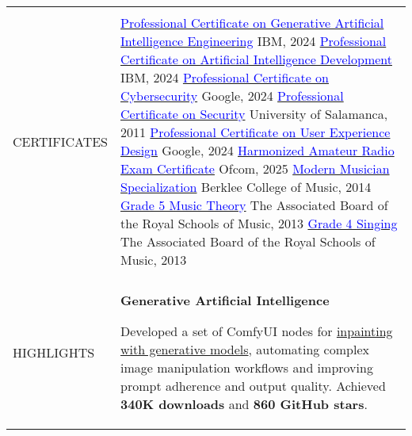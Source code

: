 \documentclass[letterpaper,10pt,oneside]{article}
\newcommand{\DatestampY}[1]{#1}
\newcommand{\itemspacingtwo}{\vspace{0.04cm}}
\newcommand{\sref}[2]{%
    \href{https://0/local/attachments/#1}{\textcolor{blue}{#2}}%
}
\newenvironment{body}
{\par\par
\begin{longtable}{p{0.145\textwidth}p{0.81\textwidth}}}
{\par\end{longtable}\par}
\renewcommand{\section}[3]{\\[-0.35cm]\pdfbookmark[2]{#2}{#3}\\%
\raggedleft  %
{\fontsize{9.5pt}{9.5pt}\selectfont\bfseries\raggedright%
\MakeUppercase{#1}}&}
\begin{document}
\begin{body}
\section{Certificates}{Certificates}{PDF:Certificates}
\sref{Certificate-Coursera-IBM-GenerativeAIEngineering.pdf}{Professional Certificate on Generative Artificial Intelligence Engineering} \textemdash{ }IBM, \DatestampY{2024} \newline
\sref{Certificate-Coursera-IBM-AIDeveloper.pdf}{Professional Certificate on Artificial Intelligence Development} \textemdash{ }IBM, \DatestampY{2024} \newline
\sref{Certificate-Coursera-Google-Cybersecurity.pdf}{Professional Certificate on Cybersecurity} \textemdash{ }Google, \DatestampY{2024} \newline
\sref{Certificate-Certyred.pdf}{Professional Certificate on Security} \textemdash{ }University of Salamanca, \DatestampY{2011} \newline
\sref{Certificate-Coursera-Google-UX-Design.pdf}{Professional Certificate on User Experience Design} \textemdash{ }Google, \DatestampY{2024} \newline
\sref{Certificate-HAREC.pdf}{Harmonized Amateur Radio Exam Certificate} \textemdash{ }Ofcom, \DatestampY{2025} \newline
\sref{Diploma-BerkleeCollege-ModernMusician.pdf}{Modern Musician Specialization} \textemdash{ }Berklee College of Music, \DatestampY{2014} \newline
\sref{Diploma-ABRSM-MusicTheory5.pdf}{Grade 5 Music Theory} \textemdash{ }The Associated Board of the Royal Schools of Music, \DatestampY{2013} \newline
\sref{Diploma-ABRSM-SingingGrade4.pdf}{Grade 4 Singing} \textemdash{ }The Associated Board of the Royal Schools of Music, \DatestampY{2013}

\section{Highlights}{Highlights}{PDF:Highlights}
\textbf{Generative Artificial Intelligence}
\begin{comp}
\item Developed a set of ComfyUI nodes for \href{https://registry.comfy.org/nodes/comfyui-inpaint-cropandstitch}{inpainting with generative models}, automating complex image manipulation workflows and improving prompt adherence and output quality.
    \newline Achieved \textbf{340K downloads} and \textbf{860 GitHub stars}.
\end{comp}
\itemspacingtwo


\end{body}
\end{document}
